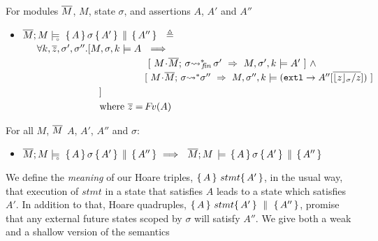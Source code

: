 \begin{definition}
\label{def:restrict}
For modules $\overline{M}$, $M$, state $\sigma$,  
and assertions $A$, $A'$ and  $A''$
\begin{itemize}
\item
$ {\overline{M};M \models\!\!\!\!_{_{\circ}}\  \, \{\, A\,\}\, \sigma\, \{\, A'\,\} \,\parallel\, \{\, A''\,\}  } \ \ \triangleq \ \ $  \\
$\strut \hspace{.5cm} \forall k, \overline{z}, \sigma',\sigma''.[
  M,\sigma ,{k} \models {A}   \  
  \ \Longrightarrow$\\
$\strut \hspace{4.5cm}    [ \ {\leadstoBoundedStarFin {M\madd \Mtwo}{\sigma}  {\sigma'} }\  \Rightarrow \    \satDAssertFrom M  {\sigma'} k   {\sdN{A'}}   \ ]
 \ \wedge$\\
$\strut \hspace{4.5cm}    [ \ {\leadstoBoundedStar  {M\madd \Mtwo}{\sigma}  {\sigma''} }\  \Rightarrow\      \satDAssertFrom M  {\sigma''}  k  {(\externalexec \rightarrow A''[\sdN{\overline{\interpret \sigma z/z}}])} \ ] $\\
$\strut \hspace{2.3cm}\ \ \ \ ]  $ \\
$\strut \hspace{2.3cm}\ \ \ \  \mbox{where }  {{ \overline z= {\hspace{-1pt}F\hspace{-1pt}}v(A)}}$ %
\end{itemize}
\end{definition}



 
\begin{lemma} 
For all $M$, $\overline{M}$ $A$, $A'$, $A''$ and $\sigma$:
\begin{itemize}
\item
$ {\overline{M};M \models\!\!\!\!_{_{\circ}}\  \, \{\, A\,\}\, \sigma\, \{\, A'\,\} \,\parallel\, \{\, A''\,\}  } \ \Longrightarrow \ \
  {\overline{M}; M\, \models \, \{\, A\,\}\, \sigma \, \{\, A'\,\} \,\parallel\, \{\, A''\,\}  } $
\end{itemize}
\end{lemma}

\label{sect:HLmeans}

We  define the {\emph {meaning}} of  our Hoare triples, $ \{\, A \, \}\ stmt \{\, A' \, \}$,  in the usual way, \ie that execution of $stmt$ in a state that satisfies $A$ leads to a state which satisfies $A'$.  
In addition to that, Hoare quadruples, $ \{\, A \, \}\ stmt \{\, A' \, \} \, \,\parallel\,\, \{\, A'' \, \} $, promise that any external future states scoped by $\sigma$ will satisfy $A''$.
We give both a weak and a shallow version of the semantics


